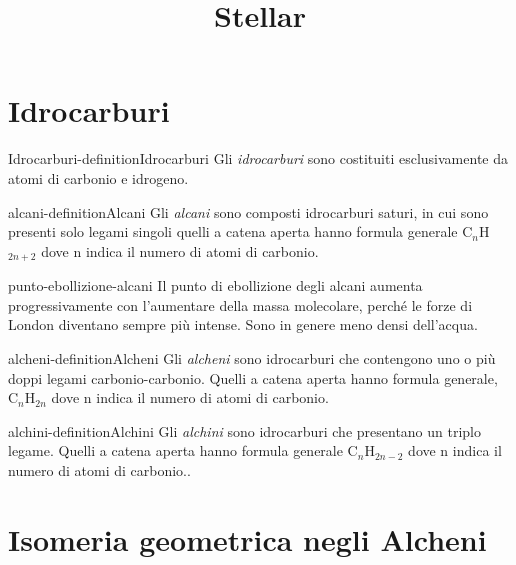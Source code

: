 \documentclass[preview]{standalone}
\begin{document}
\title{Stellar}
\genpage

\section{Idrocarburi}

\begin{snippetdefinition}{Idrocarburi-definition}{Idrocarburi}
    Gli \textit{idrocarburi} sono costituiti esclusivamente da atomi di
    carbonio e idrogeno.
\end{snippetdefinition}

\begin{snippetdefinition}{alcani-definition}{Alcani}
    Gli \textit{alcani} sono composti idrocarburi saturi, in cui sono presenti solo
    legami singoli quelli a catena aperta hanno formula generale
    C\({}_n\)H\({}_{2n+2}\) dove n indica il numero di atomi di carbonio.
\end{snippetdefinition}

\begin{snippet}{punto-ebollizione-alcani}
    Il punto di ebollizione degli alcani aumenta progressivamente con
    l'aumentare della massa molecolare, perché le forze di London
    diventano sempre più intense. Sono in genere meno densi
    dell'acqua.
\end{snippet}

\begin{snippetdefinition}{alcheni-definition}{Alcheni}
    Gli \textit{alcheni} sono idrocarburi che contengono uno o più doppi
    legami carbonio-carbonio.
    Quelli a catena aperta hanno formula generale, C\({}_n\)H\({}_{2n}\)
    dove n indica il numero di atomi di carbonio.
\end{snippetdefinition}

\begin{snippetdefinition}{alchini-definition}{Alchini}
    Gli \textit{alchini} sono idrocarburi che presentano un triplo legame. Quelli a catena
    aperta hanno formula generale C\({}_n\)H\({}_{2n-2}\)
    dove n indica il numero di atomi di carbonio.. 
\end{snippetdefinition}


\section{Isomeria geometrica negli Alcheni}
\end{document}
